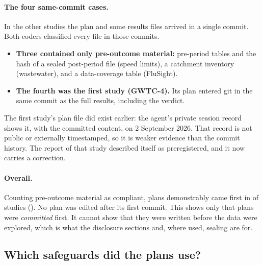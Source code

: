 \paragraph{The four same-commit cases.} In the other \PreregSameCommit{} studies the plan and some results files arrived
in a single commit. Both coders classified every file in those commits.
\begin{itemize}
\item \textbf{Three contained only pre-outcome material:} pre-period tables and the hash of a sealed post-period file
(speed limits), a catchment inventory (wastewater), and a data-coverage table (FluSight).
\item \textbf{The fourth was the first study (GWTC-4).} Its plan entered git in the same commit as the full results,
including the verdict.
\end{itemize}
The first study's plan file did exist earlier: the agent's private session record shows it, with the committed
content, on 2 September 2026. That record is not public or externally timestamped, so it is weaker evidence than the
commit history. The report of that study described itself as preregistered, and it now carries a correction.

\paragraph{Overall.} Counting pre-outcome material as compliant, plans demonstrably came first in
\PreregPassClassified{} of \StudiesTotal{} studies (\CIPreregClassified{}). No plan was edited after its first commit.
This shows only that plans were \emph{committed} first. It cannot show that they were written before the data were
explored, which is what the disclosure sections and, where used, sealing are for.

\subsection{Which safeguards did the plans use?}
\label{sec:inventory}

